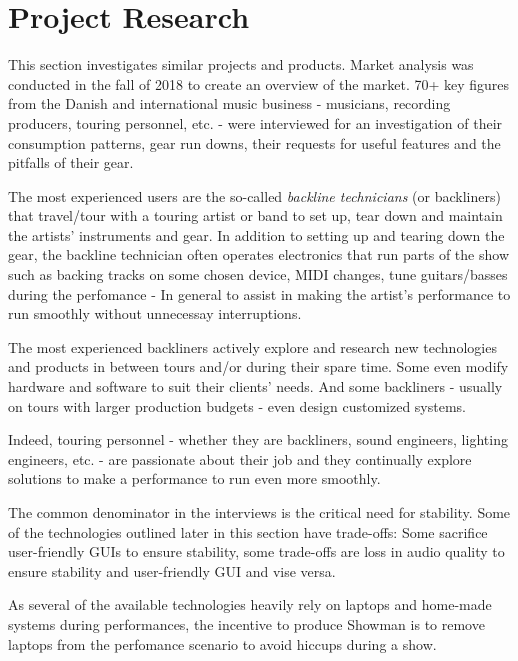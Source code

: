 \chapter{Project Research}
This section investigates similar projects and products. Market analysis was conducted in the fall of 2018 to create an overview of the market. 70+ key figures from the Danish and international music business - musicians, recording producers, touring personnel, etc. - were interviewed for an investigation of their consumption patterns, gear run downs, their requests for useful features and the pitfalls of their gear. \newline

The most experienced users are the so-called \textit{backline technicians} (or backliners) that travel/tour with a touring artist or band to set up, tear down and maintain the artists' instruments and gear. In addition to setting up and tearing down the gear, the backline technician often operates electronics that run parts of the show such as backing tracks on some chosen device, MIDI changes, tune guitars/basses during the perfomance - In general to assist in making the artist's performance to run smoothly without unnecessay interruptions. \newline

The most experienced backliners actively explore and research new technologies and products in between tours and/or during their spare time. Some even modify hardware and software to suit their clients' needs. And some backliners - usually on tours with larger production budgets - even design customized systems. \newline

Indeed, touring personnel - whether they are backliners, sound engineers, lighting engineers, etc. - are passionate about their job and they continually explore solutions to make a performance to run even more smoothly. \newline

The common denominator in the interviews is the critical need for stability. Some of the technologies outlined later in this section have trade-offs: Some sacrifice user-friendly GUIs to ensure stability, some trade-offs are loss in audio quality to ensure stability and user-friendly GUI and vise versa. \newline

As several of the available technologies heavily rely on laptops and home-made systems during performances, the incentive to produce Showman is to remove laptops from the perfomance scenario to avoid hiccups during a show. \newline

